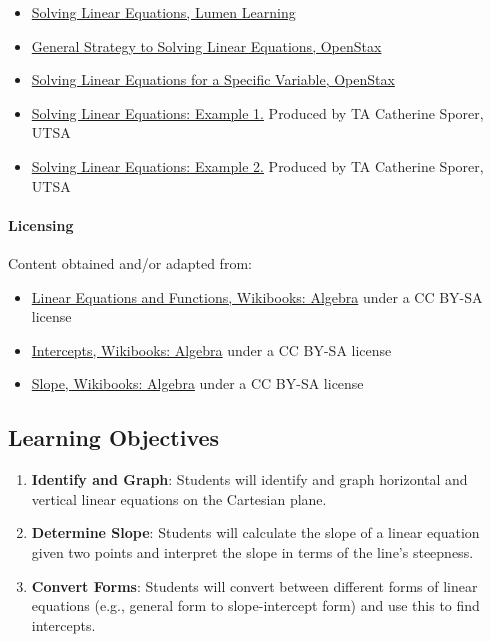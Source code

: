 \begin{itemize}
    \item \href{https://courses.lumenlearning.com/beginalgebra/chapter/introduction-to-solving-linear-equations/}{Solving Linear Equations, Lumen Learning}
    \item \href{https://openstax.org/books/intermediate-algebra-2e/pages/2-1-use-a-general-strategy-to-solve-linear-equations}{General Strategy to Solving Linear Equations, OpenStax}
    \item \href{https://openstax.org/books/intermediate-algebra-2e/pages/2-3-solve-a-formula-for-a-specific-variable}{Solving Linear Equations for a Specific Variable, OpenStax}
    \item \href{https://www.youtube.com/watch?v=bsGyJ0GeRy8}{Solving Linear Equations: Example 1.} Produced by TA Catherine Sporer, UTSA
    \item \href{https://www.youtube.com/watch?v=nGZcfHQEdqo}{Solving Linear Equations: Example 2.} Produced by TA Catherine Sporer, UTSA
\end{itemize}

\paragraph{Licensing}

Content obtained and/or adapted from:

\begin{itemize}
    \item \href{https://en.wikibooks.org/wiki/Algebra/Linear_Equations_and_Functions}{Linear Equations and Functions, Wikibooks: Algebra} under a CC BY-SA license
    \item \href{https://en.wikibooks.org/wiki/Algebra/Intercepts}{Intercepts, Wikibooks: Algebra} under a CC BY-SA license
    \item \href{https://en.wikibooks.org/wiki/Algebra/Slope}{Slope, Wikibooks: Algebra} under a CC BY-SA license
\end{itemize}

\subsection{Learning Objectives}

\begin{enumerate}
    \item \textbf{Identify and Graph}: Students will identify and graph horizontal and vertical linear equations on the Cartesian plane.
    \item \textbf{Determine Slope}: Students will calculate the slope of a linear equation given two points and interpret the slope in terms of the line's steepness.
    \item \textbf{Convert Forms}: Students will convert between different forms of linear equations (e.g., general form to slope-intercept form) and use this to find intercepts.
\end{enumerate}

